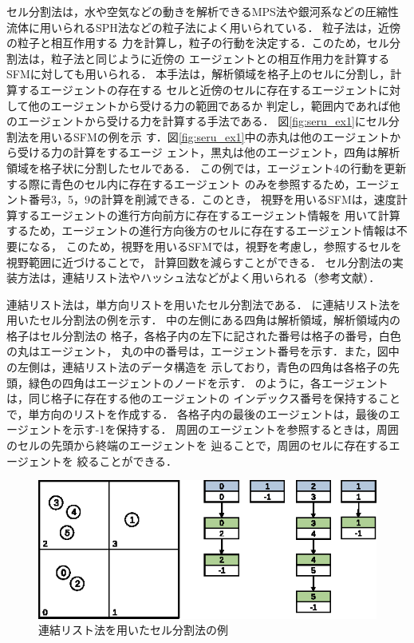 セル分割法は，水や空気などの動きを解析できるMPS法\cite{mps}や銀河系などの圧縮性
流体に用いられるSPH法\cite{sph}などの粒子法によく用いられている．
粒子法は，近傍の粒子と相互作用する
力を計算し，粒子の行動を決定する．このため，セル分割法は，粒子法と同じように近傍の
エージェントとの相互作用力を計算するSFMに対しても用いられる．
本手法は，解析領域を格子上のセルに分割し，計算するエージェントの存在する
セルと近傍のセルに存在するエージェントに対して他のエージェントから受ける力の範囲であるか
判定し，範囲内であれば他のエージェントから受ける力を計算する手法である．
図\ref{fig:seru_ex1}にセル分割法を用いるSFMの例を示
す．図\ref{fig:seru_ex1}中の赤丸は他のエージェントから受ける力の計算をするエージ
ェント，黒丸は他のエージェント，四角は解析領域を格子状に分割したセルである．
この例では，エージェント4の行動を更新する際に青色のセル内に存在するエージェント
のみを参照するため，エージェント番号3，5，9の計算を削減できる．このとき，
視野を用いるSFMは，速度計算するエージェントの進行方向前方に存在するエージェント情報を
用いて計算するため，エージェントの進行方向後方のセルに存在するエージェント情報は不要になる，
このため，視野を用いるSFMでは，視野を考慮し，参照するセルを視野範囲に近づけることで，
計算回数を減らすことができる．
セル分割法の実装方法は，連結リスト法やハッシュ法などがよく用いられる（参考文献）．

連結リスト法は，単方向リストを用いたセル分割法である．
に連結リスト法を用いたセル分割法の例を示す．
中の左側にある四角は解析領域，解析領域内の格子はセル分割法の
格子，各格子内の左下に記された番号は格子の番号，白色の丸はエージェント，
丸の中の番号は，エージェント番号を示す．また，図中の左側は，連結リスト法のデータ構造を
示しており，青色の四角は各格子の先頭，緑色の四角はエージェントのノードを示す．
のように，各エージェントは，同じ格子に存在する他のエージェントの
インデックス番号を保持することで，単方向のリストを作成する．
各格子内の最後のエージェントは，最後のエージェントを示す-1を保持する．
周囲のエージェントを参照するときは，周囲のセルの先頭から終端のエージェントを
辿ることで，周囲のセルに存在するエージェントを
絞ることができる．

\begin{figure}[t]
 \begin{center}
  \includegraphics[width=11.5cm,clip]{figure/serubunkatu_serurinku.eps}
  \caption{連結リスト法を用いたセル分割法の例}
  \label{fig:renketu_list}
 \end{center}
\end{figure}

